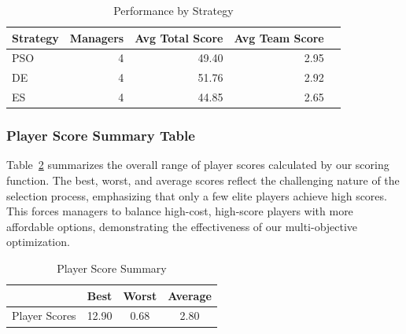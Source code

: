 \documentclass[sigconf]{acmart}
\begin{document}
\begin{table}[H]
	\centering
	\caption{Performance by Strategy}
	\label{tab:performance_by_strategy}
	\begin{tabular}{lrrrr}
		\toprule
		\textbf{Strategy} & \textbf{Managers} & \textbf{Avg Total Score} & \textbf{Avg Team Score} \\
		\midrule
		PSO & 4 & 49.40 & 2.95 \\
		DE  & 4 & 51.76 & 2.92 \\
		ES  & 4 & 44.85 & 2.65 \\
		\bottomrule
	\end{tabular}
\end{table}

\subsubsection{Player Score Summary Table}
Table~\ref{tab:player_summary} summarizes the overall range of player scores calculated by our scoring function. The best, worst, and average scores reflect the challenging nature of the selection process, emphasizing that only a few elite players achieve high scores. This forces managers to balance high-cost, high-score players with more affordable options, demonstrating the effectiveness of our multi-objective optimization.

\begin{table}[H]
	\centering
	\caption{Player Score Summary}
	\label{tab:player_summary}
	\begin{tabular}{lccc}
		\toprule
		& \textbf{Best} & \textbf{Worst} & \textbf{Average} \\
		\midrule
		Player Scores & 12.90 & 0.68 & 2.80 \\
		\bottomrule
	\end{tabular}
\end{table}
\end{document}
